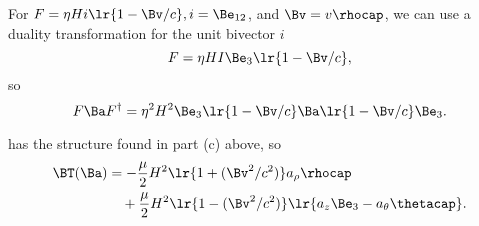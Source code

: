 For \( F = \eta H i \lr{ 1 - \Bv/c }, i = \Be_{12} \), and \( \Bv = v \rhocap \), we can use a duality transformation for the unit bivector \( i \)
\begin{equation}\label{eqn:poyntingStaticExamples:1340}
F = \eta H I \Be_3 \lr{ 1 - \Bv/c },
\end{equation}
so
\begin{equation}\label{eqn:poyntingStaticExamples:1360}
F \Ba F^\dagger = \eta^2 H^2 \Be_3 \lr{ 1 - \Bv/c } \Ba \lr{ 1 - \Bv/c } \Be_3.
\end{equation}

 has the structure found in part (c) above, so
\begin{equation}\label{eqn:poyntingStaticExamples:1380}
\begin{aligned}
\BT(\Ba)
&=
-\frac{\mu}{2} H^2 \lr{ 1 + (\Bv^2/c^2) } a_\rho \rhocap \\
&\quad +
\frac{\mu}{2} H^2 \lr{ 1 - (\Bv^2/c^2) } \lr{ a_z \Be_3 - a_\theta \thetacap }.
\end{aligned}
\end{equation}

